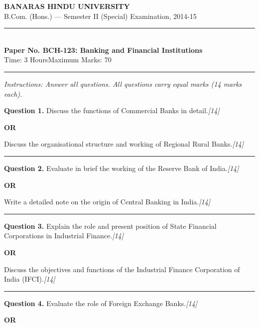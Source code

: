 \documentclass[11pt,a4paper]{article}
\newcommand{\pts}[1]{\hfill   \textit{[#1]}}
\begin{document}
\begin{center}
  {\large\bfseries BANARAS HINDU UNIVERSITY}\\[2pt]
  {\normalsize B.Com. (Hons.) --- Semester II (Special) Examination, 2014-15}\\[6pt]
  \rule{0.8\linewidth}{0.5pt}\\[6pt]
  {\large\bfseries Paper No. BCH-123: Banking and Financial Institutions}\\[4pt]
  {\normalsize Time: 3 Hours\hfill Maximum Marks: 70}
\end{center}

\rule{\linewidth}{0.4pt}

\smallskip



\noindent   \textit{Instructions: Answer all questions. All questions carry equal marks (14 marks each).}

\bigskip




\noindent   \textbf{Question 1.}
Discuss the functions of Commercial Banks in detail.\pts{14}

\centerline{   \textbf{OR}}

Discuss the organisational structure and working of Regional Rural Banks.\pts{14}

\medskip\rule{\linewidth}{0.2pt}




\noindent   \textbf{Question 2.}
Evaluate in brief the working of the Reserve Bank of India.\pts{14}

\centerline{   \textbf{OR}}

Write a detailed note on the origin of Central Banking in India.\pts{14}

\medskip\rule{\linewidth}{0.2pt}




\noindent   \textbf{Question 3.}
Explain the role and present position of State Financial Corporations in Industrial Finance.\pts{14}

\centerline{   \textbf{OR}}

Discuss the objectives and functions of the Industrial Finance Corporation of India (IFCI).\pts{14}

\medskip\rule{\linewidth}{0.2pt}




\noindent   \textbf{Question 4.}
Evaluate the role of Foreign Exchange Banks.\pts{14}

\centerline{   \textbf{OR}}
\end{document}
